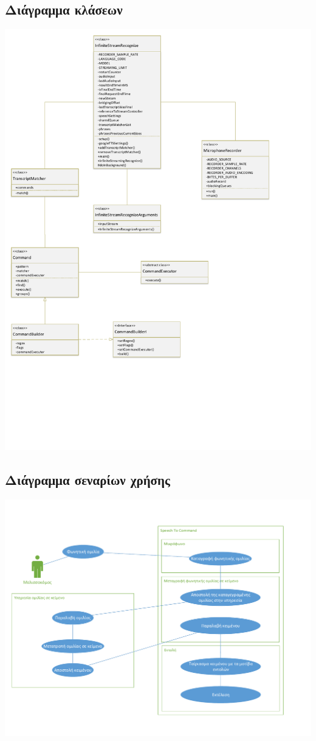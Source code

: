 \documentclass[oneside, 12pt]{book}
\begin{document}
\subsection{Διάγραμμα κλάσεων}\label{sec:διάγραμμα-κλάσεων}
\includegraphics[scale=0.5]{uml/library_uml_class_diagram.pdf}
\subsection{Διάγραμμα σεναρίων χρήσης}\label{sec:διάγραμμα-σεναρίων-χρήσης}
\includegraphics[scale=0.5]{uml/library_uml_use_case_diagram.pdf}
\end{document}
